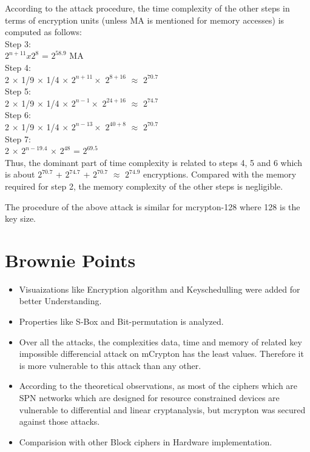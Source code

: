 \documentclass{transcrypto}
\begin{document}
	 According to the attack procedure, the time complexity of the other steps in terms of encryption units (unless MA is mentioned for memory accesses) is computed as follows: \\
	 Step 3:\\
	 $2^{n+11}x2^8$ = $2^{58.9}$  MA \\
	 Step 4: \\
	 2 $\times$ 1/9 $\times$ 1/4 $\times$ $2^{n+11} \times$ $2^{8+16}$ $\approx$ $2^{70.7}$ \\
	 Step 5: \\
	 2 $\times$ 1/9 $\times$ 1/4 $\times$ $2^{n-1} \times$ $2^{24+16}$ $\approx$ $2^{74.7}$ \\
	 Step 6: \\
	 2 $\times$ 1/9 $\times$ 1/4 $\times$ $2^{n-13} \times$ $2^{40+8}$ $\approx$ $2^{70.7} $\\
	 Step 7: \\
	 2 $\times$ $2^{n-19.4}$ $\times$ $2^{48}$ = $2^{69.5}$ \\
	 Thus, the dominant part of time complexity is related to steps 4, 5 and 6 which is about $2^{70.7}$ + $2^{74.7}$ + $2^{70.7}$ $\approx$ $2^{74.9}$ encryptions. Compared with the memory required for step 2, the memory complexity of the other steps is negligible.
	
	 The procedure of the above attack is similar for mcrypton-128 where 128 is the key size.
	 
	
	
	\section*{Brownie Points}
	\begin{itemize}
		\item Visuaizations like Encryption algorithm and Keyschedulling were added for better Understanding.
		\item Properties like S-Box and Bit-permutation is analyzed.
		\item Over all the attacks, the complexities data, time and memory of related key impossible differencial attack on mCrypton has the least values. Therefore it is more vulnerable to this attack than any other.
		\item According to the theoretical observations, as most of the ciphers which are SPN networks which are designed for resource constrained devices are vulnerable to differential and linear cryptanalysis, but mcrypton was secured against those attacks.
		\item Comparision with other Block ciphers in Hardware implementation.
	\end{itemize}
\end{document}
